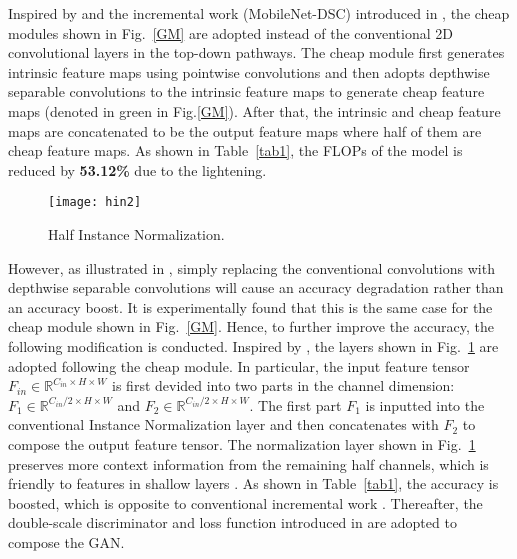 \documentclass[letterpaper, 10 pt, conference]{ieeeconf}
\begin{document}
Inspired by \cite{ghostnet} and the incremental work (MobileNet-DSC) introduced in \cite{deblurgan2}, the cheap modules shown in Fig.~\ref{GM} are adopted instead of the conventional 2D convolutional layers in the top-down pathways. The cheap module first generates intrinsic feature maps using pointwise convolutions \cite{pw} and then adopts depthwise separable convolutions \cite{dw} to the intrinsic feature maps to generate cheap feature maps (denoted in green in Fig.\ref{GM}).  After that, the intrinsic and cheap feature maps are concatenated to be the output feature maps where half of them are cheap feature maps. As shown in Table~\ref{tab1}, the FLOPs of the model is reduced by \textbf{53.12\%} due to the lightening.
 \begin{figure}[thpb]
	\centering
	\texttt{[image: hin2]}
	\caption{Half Instance Normalization.}
	\label{hin}
\end{figure}

However, as illustrated in \cite{deblurgan2}, simply replacing the conventional convolutions with depthwise separable convolutions will cause an accuracy degradation rather than an accuracy boost. It is experimentally found that this is the same case for the cheap module shown in Fig.~\ref{GM}. Hence, to further improve the accuracy, the following modification is conducted. Inspired by \cite{chen2021hinet}, the layers shown in Fig.~\ref{hin} are adopted following the cheap module.  In particular, the input feature tensor $F_{in}\in\mathbb{R}^{C_{in}\times H \times W}$ is first devided into two parts in the channel dimension: $F_{1}\in\mathbb{R}^{C_{in}/2\times H \times W}$ and $F_{2}\in\mathbb{R}^{C_{in}/2\times H \times W}$. The first part $F_{1}$ is inputted into the conventional Instance Normalization layer \cite{in} and then concatenates with $F_{2}$ to compose the output feature tensor.  The normalization layer shown in Fig.~\ref{hin} preserves more context information from the remaining half channels, which is friendly to features in shallow layers \cite{chen2021hinet}. As shown in Table~\ref{tab1}, the accuracy is boosted, which is opposite to conventional incremental work \cite{truong2020slimdeblurgan,chen2021hinet}. Thereafter, the double-scale discriminator and loss function introduced in \cite{deblurgan2} are adopted to compose the GAN. 
\end{document}

